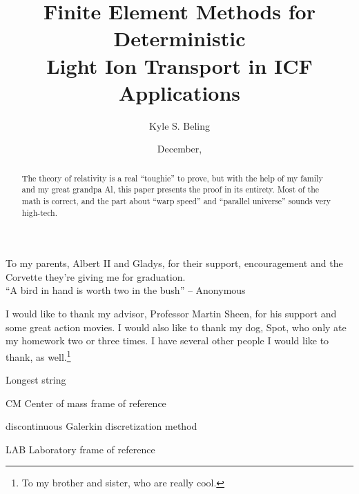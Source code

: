 \title{Finite Element Methods for Deterministic
    \\ Light Ion Transport in ICF Applications}

\author{Kyle S. Beling}





\date{December, \thisyear}

\maketitle

\begin{dedication}
  To my parents, Albert II and Gladys, for their support,
  encouragement and the Corvette they're giving me for graduation. \\[3ex]
  ``A bird in hand is worth two in the bush''
        -- Anonymous
\end{dedication}

\begin{acknowledgments}
    \vspace{1.1in}
    I would like to thank my advisor, Professor Martin Sheen, for his support
    and some great action movies.  I would also like to thank my dog, Spot,
    who only ate my homework two or three times.  I have several other people
    I would like to thank, as well.\footnote{To my brother and sister, who
    are really cool.}
\end{acknowledgments}

\maketitleabstract %

\begin{abstract}
    The theory of relativity is a real ``toughie'' to prove, but with the
    help of my family and my great grandpa Al, this paper presents the
    proof in its entirety.  Most of the math is correct, and the
    part about ``warp speed'' and ``parallel universe'' sounds very high-tech.
\clearpage %
\end{abstract}

\tableofcontents
\listoffigures
\listoftables

\begin{glossary}{Longest  string}
    \item[CM] Center of mass frame of reference
    \item[\dG] discontinuous Galerkin discretization method
    \item[LAB] Laboratory frame of reference
\end{glossary}